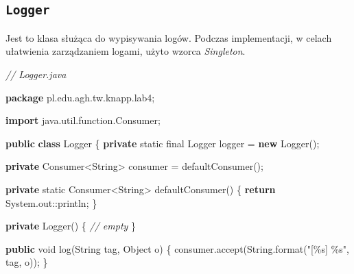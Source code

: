\documentclass[11pt]{article}
\newenvironment{Shaded}{}{}
\newcommand{\KeywordTok}[1]{\textcolor[rgb]{0.00,0.44,0.13}{\textbf{{#1}}}}
\newcommand{\DataTypeTok}[1]{\textcolor[rgb]{0.56,0.13,0.00}{{#1}}}
\newcommand{\StringTok}[1]{\textcolor[rgb]{0.25,0.44,0.63}{{#1}}}
\newcommand{\CommentTok}[1]{\textcolor[rgb]{0.38,0.63,0.69}{\textit{{#1}}}}
\newcommand{\FunctionTok}[1]{\textcolor[rgb]{0.02,0.16,0.49}{{#1}}}
\newcommand{\NormalTok}[1]{{#1}}
\newcommand{\SpecialCharTok}[1]{\textcolor[rgb]{0.25,0.44,0.63}{{#1}}}
\newcommand{\ImportTok}[1]{{#1}}
\newcommand{\ControlFlowTok}[1]{\textcolor[rgb]{0.00,0.44,0.13}{\textbf{{#1}}}}
\newcommand{\OperatorTok}[1]{\textcolor[rgb]{0.40,0.40,0.40}{{#1}}}
\newcommand{\BuiltInTok}[1]{{#1}}
\begin{document}
    \hypertarget{logger}{%
\subsection{\texorpdfstring{\texttt{Logger}}{Logger}}\label{logger}}

Jest to klasa służąca do wypisywania logów. Podczas implementacji, w
celach ułatwienia zarządzaniem logami, użyto wzorca \emph{Singleton}.

\begin{Shaded}
\begin{Highlighting}[]
\CommentTok{// Logger.java}

\KeywordTok{package}\ImportTok{ pl}\OperatorTok{.}\ImportTok{edu}\OperatorTok{.}\ImportTok{agh}\OperatorTok{.}\ImportTok{tw}\OperatorTok{.}\ImportTok{knapp}\OperatorTok{.}\ImportTok{lab4}\OperatorTok{;}

\KeywordTok{import} \ImportTok{java}\OperatorTok{.}\ImportTok{util}\OperatorTok{.}\ImportTok{function}\OperatorTok{.}\ImportTok{Consumer}\OperatorTok{;}

\KeywordTok{public} \KeywordTok{class} \BuiltInTok{Logger} \OperatorTok{\{}
    \KeywordTok{private} \DataTypeTok{static} \DataTypeTok{final} \BuiltInTok{Logger}\NormalTok{ logger }\OperatorTok{=} \KeywordTok{new} \BuiltInTok{Logger}\OperatorTok{();}

    \KeywordTok{private}\NormalTok{ Consumer}\OperatorTok{\textless{}}\BuiltInTok{String}\OperatorTok{\textgreater{}}\NormalTok{ consumer }\OperatorTok{=} \FunctionTok{defaultConsumer}\OperatorTok{();}
    
    \KeywordTok{private} \DataTypeTok{static}\NormalTok{ Consumer}\OperatorTok{\textless{}}\BuiltInTok{String}\OperatorTok{\textgreater{}} \FunctionTok{defaultConsumer}\OperatorTok{()} \OperatorTok{\{}
        \ControlFlowTok{return} \BuiltInTok{System}\OperatorTok{.}\FunctionTok{out}\OperatorTok{::}\NormalTok{println}\OperatorTok{;}
    \OperatorTok{\}}

    \KeywordTok{private} \BuiltInTok{Logger}\OperatorTok{()} \OperatorTok{\{}
        \CommentTok{// empty}
    \OperatorTok{\}}

    \KeywordTok{public} \DataTypeTok{void} \FunctionTok{log}\OperatorTok{(}\BuiltInTok{String}\NormalTok{ tag}\OperatorTok{,} \BuiltInTok{Object}\NormalTok{ o}\OperatorTok{)} \OperatorTok{\{}
\NormalTok{        consumer}\OperatorTok{.}\FunctionTok{accept}\OperatorTok{(}\BuiltInTok{String}\OperatorTok{.}\FunctionTok{format}\OperatorTok{(}\StringTok{"[}\SpecialCharTok{\%s}\StringTok{] }\SpecialCharTok{\%s}\StringTok{"}\OperatorTok{,}\NormalTok{ tag}\OperatorTok{,}\NormalTok{ o}\OperatorTok{));}
    \OperatorTok{\}}


\end{Highlighting}
\end{Shaded}
\end{document}
